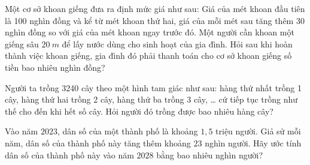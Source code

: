 \begin{bt}%
 
	Một cơ sở khoan giếng đưa ra định mức giá như sau: Giá của mét khoan đầu tiên là 100 nghìn đồng và kể từ mét khoan thứ hai, giá của mỗi mét sau tăng thêm 30 nghìn đồng so với giá của mét khoan ngay trước đó. Một người cần khoan một giếng sâu ${20 {~m}}$ để lấy nước dùng cho sinh hoạt của gia đình. Hỏi sau khi hoàn thành việc khoan giếng, gia đình đó phải thanh toán cho cơ sở khoan giếng số tiền bao nhiêu nghìn đồng?
\end{bt}

\begin{bt}%
 
	Người ta trồng 3240 cây theo một hình tam giác như sau: hàng thứ nhất trồng 1 cây, hàng thứ hai trồng 2 cây, hàng thứ ba trồng 3 cây, … cứ tiếp tục trồng như thế cho đến khi hết số cây. Hỏi người đó trồng được bao nhiêu hàng cây?
\end{bt}

\begin{bt}%

	Vào năm $2023$, dân số của một thành phố là khoảng $1{,}5$ triệu người. Giả sử mỗi năm, dân số của thành phố này tăng thêm khoảng $23$ nghìn người. Hãy ước tính dân số của thành phố này vào năm $2028$ bằng bao nhiêu nghìn người? \par 
\end{bt}

